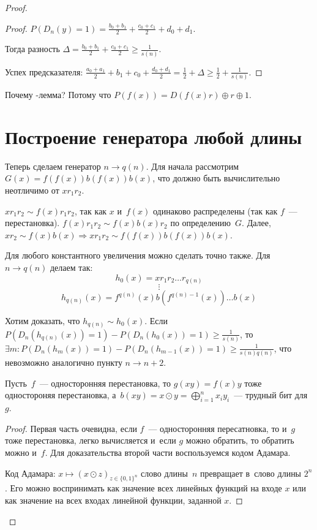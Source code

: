 \documentclass{article}
\begin{document}
\begin{proof}
\begin{proof}
		$P(D_n(y) = 1) = \frac{b_0 + b_1}{2} + \frac{c_0 + c_1}{2} + d_0 + d_1$.

		Тогда разность $\Delta = \frac{b_0 + b_1}{2} + \frac{c_0 + c_1}{2} \ge
		\frac{1}{s(n)}$.

		Успех предсказателя: $\frac{a_0 + a_1}{2} + b_1 + c_0 + \frac{d_0 +
		d_1}{2} = \frac{1}{2} + \Delta \ge \frac{1}{2} + \frac{1}{s(n)}$.
	\end{proof}
	Почему -лемма? Потому что $P(f(x)) = D(f(x)r) \oplus r \oplus 1$.

\section{Построение генератора любой длины}

	Теперь сделаем генератор $n \rightarrow q(n)$. Для начала рассмотрим $G(x) =
	f(f(x))b(f(x))b(x)$, что должно быть вычислительно неотличимо от $x r_1 r_2$.

	$x r_1 r_2 \sim f(x) r_1 r_2$, так как $x$ и~$f(x)$ одинаково распределены
	(так как $f$~--- перестановка). $f(x) r_1 r_2 \sim f(x) b(x) r_2$ по
	определению~$G$. Далее, $x r_2 \sim f(x)b(x) \Rightarrow x r_1 r_2 \sim
	f(f(x))b(f(x))b(x)$.

	Для любого константного увеличения можно сделать точно также. Для $n
	\rightarrow q(n)$ делаем так:
	$$ h_0(x) = x r_1 r_2 \ldots r_{q(n)} $$
	$$ \vdots $$
	$$ h_{q(n)}(x) = f^{q(n)}(x) b(f^{q(n)-1}(x)) \ldots b(x) $$

	Хотим доказать, что $h_{q(n)} \sim h_0(x)$. Если $P(D_n(h_{q(n)}(x)) = 1) -
	P(D_n(h_0(x)) = 1) \ge \frac{1}{s(n)}$, то $\exists m: P(D_n(h_m(x)) = 1) -
	P(D_n(h_{m-1}(x)) = 1) \ge \frac{1}{s(n)q(n)}$, что невозможно аналогично
	пункту $n \rightarrow n + 2$.

	\begin{theorem}
		Пусть~$f$~--- односторонняя перестановка, то $g(xy) = f(x)y$ тоже
		одностороняя перестановка, а~$b(xy) = x \odot y = \bigoplus\limits_{i=1}^{n}
		x_i y_i$~--- трудный бит для~$g$.
	\end{theorem}
	\begin{proof}
		Первая часть очевидна, если $f$~--- односторонняя пересатновка, то и~$g$
		тоже перестановка, легко вычисляется и~если $g$ можно обратить, то обратить
		можно и~$f$. Для доказательства второй части воспользуемся кодом Адамара.

		Код Адамара: $x \mapsto (x \odot z)_{z\in \{0, 1\}^n}$ слово длины~$n$
		превращает в~слово длины $2^n$. Его можно воспринимать как значение всех
		линейных функций на входе $x$ или как значение на всех входах линейной
		функции, заданной $x$.


\end{proof}
\end{proof}
\end{document}
